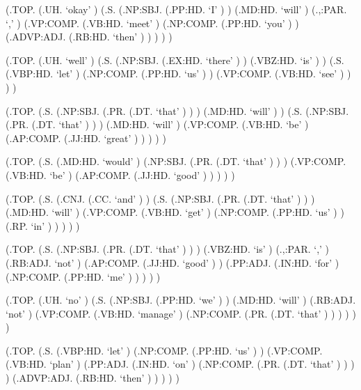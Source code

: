\documentclass[10pt]{article}
\begin{document}
\begin{parsetree}  (.TOP. (.UH. `okay' ) (.S. (.NP:SBJ. (.PP:HD. `I' ) ) (.MD:HD. `will' ) (.,:PAR. `,' ) (.VP:COMP. (.VB:HD. `meet' ) (.NP:COMP. (.PP:HD. `you' ) ) (.ADVP:ADJ. (.RB:HD. `then' ) ) ) ) ) \end{parsetree}

\begin{parsetree}  (.TOP. (.UH. `well' ) (.S. (.NP:SBJ. (.EX:HD. `there' ) ) (.VBZ:HD. `is' ) ) (.S. (.VBP:HD. `let' ) (.NP:COMP. (.PP:HD. `us' ) ) (.VP:COMP. (.VB:HD. `see' ) ) ) ) \end{parsetree}

\begin{parsetree}  (.TOP. (.S. (.NP:SBJ. (.PR. (.DT. `that' ) ) ) (.MD:HD. `will' ) ) (.S. (.NP:SBJ. (.PR. (.DT. `that' ) ) ) (.MD:HD. `will' ) (.VP:COMP. (.VB:HD. `be' ) (.AP:COMP. (.JJ:HD. `great' ) ) ) ) ) \end{parsetree}

\begin{parsetree}  (.TOP. (.S. (.MD:HD. `would' ) (.NP:SBJ. (.PR. (.DT. `that' ) ) ) (.VP:COMP. (.VB:HD. `be' ) (.AP:COMP. (.JJ:HD. `good' ) ) ) ) ) \end{parsetree}

\begin{parsetree}  (.TOP. (.S. (.CNJ. (.CC. `and' ) ) (.S. (.NP:SBJ. (.PR. (.DT. `that' ) ) ) (.MD:HD. `will' ) (.VP:COMP. (.VB:HD. `get' ) (.NP:COMP. (.PP:HD. `us' ) ) (.RP. `in' ) ) ) ) ) \end{parsetree}

\begin{parsetree}  (.TOP. (.S. (.NP:SBJ. (.PR. (.DT. `that' ) ) ) (.VBZ:HD. `is' ) (.,:PAR. `,' ) (.RB:ADJ. `not' ) (.AP:COMP. (.JJ:HD. `good' ) ) (.PP:ADJ. (.IN:HD. `for' ) (.NP:COMP. (.PP:HD. `me' ) ) ) ) ) \end{parsetree}

\begin{parsetree}  (.TOP. (.UH. `no' ) (.S. (.NP:SBJ. (.PP:HD. `we' ) ) (.MD:HD. `will' ) (.RB:ADJ. `not' ) (.VP:COMP. (.VB:HD. `manage' ) (.NP:COMP. (.PR. (.DT. `that' ) ) ) ) ) ) \end{parsetree}

\begin{parsetree}  (.TOP. (.S. (.VBP:HD. `let' ) (.NP:COMP. (.PP:HD. `us' ) ) (.VP:COMP. (.VB:HD. `plan' ) (.PP:ADJ. (.IN:HD. `on' ) (.NP:COMP. (.PR. (.DT. `that' ) ) ) ) (.ADVP:ADJ. (.RB:HD. `then' ) ) ) ) ) \end{parsetree}
\end{document}
